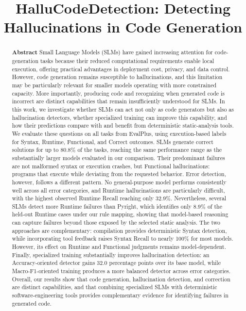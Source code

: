 \documentclass{sbc2019}
\begin{document}
\title[HalluCodeDetection]{HalluCodeDetection: Detecting Hallucinations in Code Generation}

\author[de Lima]{
}

\begin{frontmatter}
\maketitle

\begin{abstract}
\textbf{Abstract}
Small Language Models (SLMs) have gained increasing attention for code-generation tasks because their reduced computational requirements enable local execution, offering practical advantages in deployment cost, privacy, and data control. However, code generation remains susceptible to hallucinations, and this limitation may be particularly relevant for smaller models operating with more constrained capacity. More importantly, producing code and recognizing when generated code is incorrect are distinct capabilities that remain insufficiently understood for SLMs. In this work, we investigate whether SLMs can act not only as code generators but also as hallucination detectors, whether specialized training can improve this capability, and how their predictions compare with and benefit from deterministic static-analysis tools. We evaluate these questions on all tasks from EvalPlus, using execution-based labels for Syntax, Runtime, Functional, and Correct outcomes. SLMs generate correct solutions for up to 80.8\% of the tasks, reaching the same performance range as the substantially larger models evaluated in our comparison. Their predominant failures are not malformed syntax or execution crashes, but Functional hallucinations: programs that execute while deviating from the requested behavior. Error detection, however, follows a different pattern. No general-purpose model performs consistently well across all error categories, and Runtime hallucinations are particularly difficult, with the highest observed Runtime Recall reaching only 32.9\%.
Nevertheless, several SLMs detect more Runtime failures than Pyright, which identifies only 8.9\% of the held-out Runtime cases under our rule mapping, showing that model-based reasoning can capture failures beyond those exposed by the selected static analysis. The two approaches are complementary: compilation provides deterministic Syntax detection, while incorporating tool feedback raises Syntax Recall to nearly 100\% for most models. However, its effect on Runtime and Functional judgments remains model-dependent. Finally, specialized training substantially improves hallucination detection: an Accuracy-oriented detector gains 32.0 percentage points over its base model, while Macro-F1-oriented training produces a more balanced detector across error categories. Overall, our results show that code generation, hallucination detection, and correction are distinct capabilities, and that combining specialized SLMs with deterministic software-engineering tools provides complementary evidence for identifying failures in generated code.

\end{abstract}
\end{frontmatter}
\end{document}
